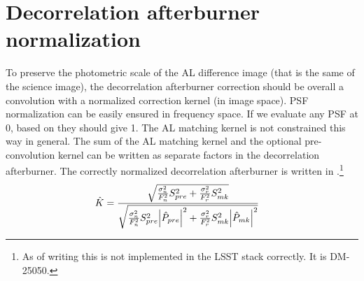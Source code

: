 \documentclass[11pt]{article}
\begin{document}
\section{Decorrelation afterburner normalization}
\par To preserve the photometric scale of the AL difference
image (that is the same of the science image), the decorrelation
afterburner correction should be overall a convolution with a
normalized correction kernel (in image space). PSF normalization can
be easily ensured in frequency space. If we evaluate any PSF at 0,
based on  they should give 1. The AL matching kernel is
not constrained this way in general. The sum of the AL matching kernel
and the optional pre-convolution kernel can be written as separate
factors in the decorrelation afterburner. The correctly normalized
decorrelation afterburner is written in .\footnote{As of
  writing this is not implemented in the LSST stack correctly. It is
  DM-25050.}
%
\begin{align}
  \hat{K} &= \frac{\sqrt{\frac{\sigma_n^2}{F_n^2}S_{pre}^2 + \frac{\sigma_r^2}{F_r^2}S_{mk}^2}}
  {\sqrt{\frac{\sigma_n^2}{F_n^2}S_{pre}^2\abs{\hat{P}_{pre}}^2 + \frac{\sigma_r^2}{F_r^2}S_{mk}^2
  \abs{\hat{P}_{mk}}^2}}
\label{eq:KPre}
\end{align}
%
\end{document}
